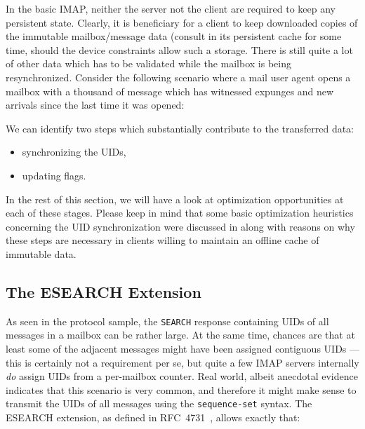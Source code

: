 \documentclass[trojita]{subfiles}
\begin{document}
In the basic IMAP, neither the server not the client are required to keep any persistent state.  Clearly, it is
beneficiary for a client to keep downloaded copies of the immutable mailbox/message data (consult
 in its persistent cache for some time, should the device constraints allow such a
storage.  There is still quite a lot of other data which has to be validated while the mailbox is being resynchronized.
Consider the following scenario where a mail user agent opens a mailbox with a thousand of message which has witnessed
expunges and new arrivals since the last time it was opened:


We can identify two steps which substantially contribute to the transferred data:

\begin{itemize}
  \item synchronizing the UIDs,
  \item updating flags.
\end{itemize}

In the rest of this section, we will have a look at optimization opportunities at each of these stages.  Please keep in
mind that some basic optimization heuristics concerning the UID synchronization were discussed in
 along with reasons on why these steps are necessary in clients willing to maintain an
offline cache of immutable data.

\subsection{The ESEARCH Extension}

As seen in the protocol sample, the {\tt SEARCH} response containing UIDs of all messages in a mailbox can be rather
large.  At the same time, chances are that at least some of the adjacent messages might have been assigned contiguous
UIDs --- this is certainly not a requirement per se, but quite a few IMAP servers internally {\em do} assign UIDs from a
per-mailbox counter.  Real world, albeit anecdotal evidence  indicates that this scenario is very common, and therefore it might make
sense to transmit the UIDs of all messages using the {\tt sequence-set} \cite[p. 89]{rfc3501} syntax.  The ESEARCH
extension, as defined in RFC~4731~\cite{rfc4731}, allows exactly that:
\end{document}
